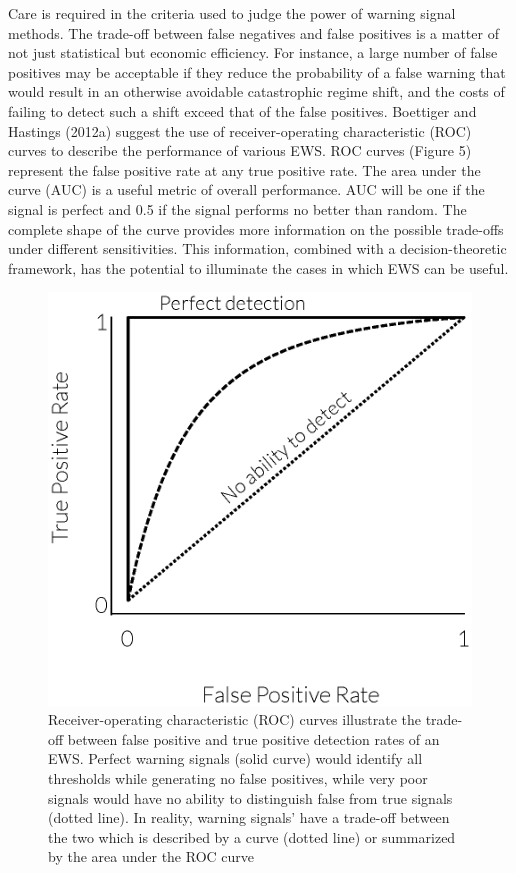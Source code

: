\documentclass{article}
\begin{document}
Care is required in the criteria used to judge the power of warning
signal methods. The trade-off between false negatives and false
positives is a matter of not just statistical but economic efficiency.
For instance, a large number of false positives may be acceptable if
they reduce the probability of a false warning that would result in an
otherwise avoidable catastrophic regime shift, and the costs of failing
to detect such a shift exceed that of the false positives. Boettiger and
Hastings (2012a) suggest the use of receiver-operating characteristic
(ROC) curves to describe the performance of various EWS. ROC curves
(Figure 5) represent the false positive rate at any true positive rate.
The area under the curve (AUC) is a useful metric of overall
performance. AUC will be one if the signal is perfect and 0.5 if the
signal performs no better than random. The complete shape of the curve
provides more information on the possible trade-offs under different
sensitivities. This information, combined with a decision-theoretic
framework, has the potential to illuminate the cases in which EWS can be
useful.

\begin{figure}[htbp]
\centering
\includegraphics{ROC.eps}
\caption{Receiver-operating characteristic (ROC) curves illustrate the
trade-off between false positive and true positive detection rates of an
EWS. Perfect warning signals (solid curve) would identify all thresholds
while generating no false positives, while very poor signals would have
no ability to distinguish false from true signals (dotted line). In
reality, warning signals' have a trade-off between the two which is
described by a curve (dotted line) or summarized by the area under the
ROC curve}
\end{figure}
\end{document}
